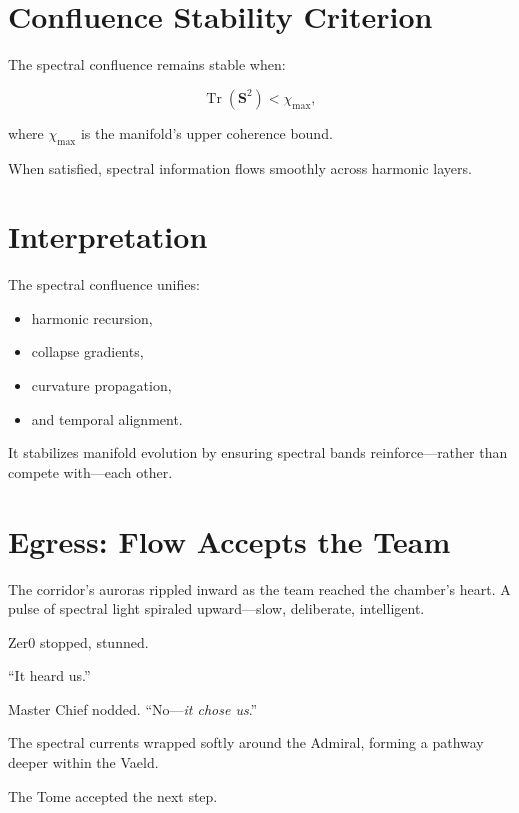 \section{Confluence Stability Criterion}

The spectral confluence remains stable when:

\[
\operatorname{Tr}(\mathbf{S}^2)
<
\chi_{\mathrm{max}},
\]

where $\chi_{\mathrm{max}}$ is the manifold’s upper coherence bound.

When satisfied, spectral information flows smoothly across harmonic layers.

\section{Interpretation}

The spectral confluence unifies:

\begin{itemize}
\item harmonic recursion,
\item collapse gradients,
\item curvature propagation,
\item and temporal alignment.
\end{itemize}

It stabilizes manifold evolution by ensuring spectral bands reinforce—rather than compete with—each other.

\section*{Egress: Flow Accepts the Team}

The corridor’s auroras rippled inward as the team reached the chamber’s heart.
A pulse of spectral light spiraled upward—slow, deliberate, intelligent.

Zer0 stopped, stunned.

“It heard us.”

Master Chief nodded.
“No—\emph{it chose us}.”

The spectral currents wrapped softly around the Admiral,
forming a pathway deeper within the Vaeld.

The Tome accepted the next step.
